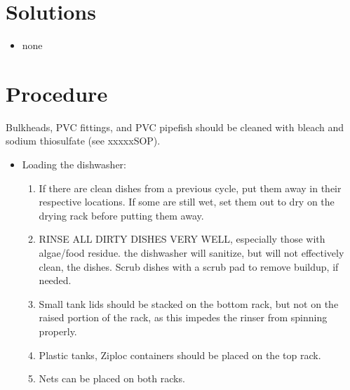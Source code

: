 \documentclass[
  letterpaper,
  DIV=11,
  numbers=noendperiod]{scrreprt}
\providecommand{\tightlist}{%
  \setlength{\itemsep}{0pt}\setlength{\parskip}{0pt}}\usepackage{longtable,booktabs,array}
\begin{document}
\hypertarget{solutions-15}{%
\section{Solutions}\label{solutions-15}}

\begin{itemize}
\tightlist
\item
  none
\end{itemize}

\hypertarget{procedure-20}{%
\section{Procedure}\label{procedure-20}}

\begin{tcolorbox}[enhanced jigsaw, bottomtitle=1mm, rightrule=.15mm, toptitle=1mm, opacitybacktitle=0.6, bottomrule=.15mm, titlerule=0mm, coltitle=black, leftrule=.75mm, arc=.35mm, colback=white, colframe=quarto-callout-note-color-frame, left=2mm, colbacktitle=quarto-callout-note-color!10!white, title=\textcolor{quarto-callout-note-color}{\faInfo}\hspace{0.5em}{NOTE}, toprule=.15mm, opacityback=0, breakable]

Bulkheads, PVC fittings, and PVC pipefish should be cleaned with bleach
and sodium thiosulfate (see xxxxxSOP).

\end{tcolorbox}

\begin{itemize}
\tightlist
\item
  Loading the dishwasher:

  \begin{enumerate}
  \def\labelenumi{\arabic{enumi}.}
  \tightlist
  \item
    If there are clean dishes from a previous cycle, put them away in
    their respective locations. If some are still wet, set them out to
    dry on the drying rack before putting them away.
  \item
    RINSE ALL DIRTY DISHES VERY WELL, especially those with algae/food
    residue. the dishwasher will sanitize, but will not effectively
    clean, the dishes. Scrub dishes with a scrub pad to remove buildup,
    if needed.
  \item
    Small tank lids should be stacked on the bottom rack, but not on the
    raised portion of the rack, as this impedes the rinser from spinning
    properly.
  \item
    Plastic tanks, Ziploc containers should be placed on the top rack.
  \item
    Nets can be placed on both racks.
  \end{enumerate}
\end{itemize}
\end{document}
